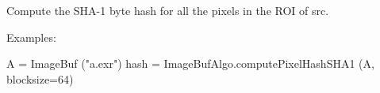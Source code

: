 \begin{comment}
\apiitem{bool {\ce color_range_check} (src, 
   imagesize_t *lowcount, \\ \bigspc imagesize_t *highcount, imagesize_t
  *inrangecount, \\
  \bigspc const float *low, const float *high, \\
        \bigspc  roi=ROI.All, nthreads=0)}
\index{ImageBufAlgo!color_range_check} \indexapi{color_range_check}

Count how many pixels in the image (within the ROI) are outside the
value range described by {\cf low[roi.chbegin..roi.chend-1]} and
{\cf high[roi.chbegin..roi.chend-1]} 
as the low and high acceptable values for each color channel.  

The number of pixels containing values that fall below the lower bound
will be stored in {\cf *lowcount}, the number of pixels containing
values that fall above the upper bound will be stored in 
{\cf *highcount}, and the number of pixels for which all channels fell
within the bounds will be stored in {\cf *inrangecount}.  Any of these
may be NULL, which simply means that the counts need not be collected or
stored.

\smallskip
\noindent Examples:
\begin{code}
    A = ImageBuf ("a.exr")
    ROI roi = get_roi (A.spec())
    roi.chend = std::min (roi.chend, 4);  # only compare RGBA

    float low[] = {0, 0, 0, 0};
    float high[] = {1, 1, 1, 1};

    imagesize_t lowcount, highcount, inrangecount;
    ImageBufAlgo.color_range_check (A, &lowcount, &highcount, &inrangecount,
                                     low, high, roi);
    print lowcount, " pixels had components < 0"
    print highcount, " pixels had components > 1"
    print inrangecount, " pixels were fully within [0,1] range"
\end{code}
\apiend
\end{comment}


 

Compute the SHA-1 byte hash for all the pixels in the ROI of {\cf src}.

\smallskip
\noindent Examples:
\begin{code}
    A = ImageBuf ("a.exr")
    hash = ImageBufAlgo.computePixelHashSHA1 (A, blocksize=64)
\end{code}
\apiend


